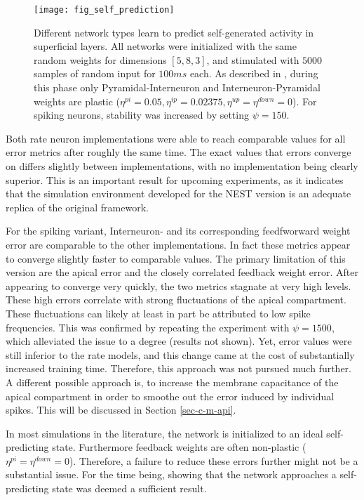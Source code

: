 \begin{figure}[t]
    \centering
    \texttt{[image: fig\_self\_prediction]}
    \caption{Different network types learn to predict self-generated activity in superficial layers. All networks were
        initialized with the same random weights for dimensions $[5, 8, 3]$, and stimulated with $5000$ samples of
        random input for $100ms$ each. As described in \cite{sacramento2018dendritic}, during this phase only
        Pyramidal-Interneuron and Interneuron-Pyramidal weights are plastic ($\eta^{pi}=0.05, \eta^{ip}=0.02375,
            \eta^{up}=\eta^{down}=0$). For spiking neurons, stability was increased by setting $\psi=150$.}
    \label{fig-self-pred}
\end{figure}

Both rate neuron implementations were able to reach comparable values for all error metrics after roughly the same time.
The exact values that errors converge on differs slightly between implementations, with no implementation being clearly
superior. This is an important result for upcoming experiments, as it indicates that the simulation environment
developed for the NEST version is an adequate replica of the original framework.

For the spiking variant, Interneuron- and its corresponding feedfworward weight error are comparable to the other
implementations. In fact these metrics appear to converge slightly faster to comparable values. The primary limitation
of this version are the apical error and the closely correlated feedback weight error. After appearing to converge very
quickly, the two metrics stagnate at very high levels. These high errors correlate with strong fluctuations of the
apical compartment. These fluctuations can likely at least in part be attributed to low spike frequencies. This was
confirmed by repeating the experiment with $\psi=1500$, which alleviated the issue to a degree (results not shown). Yet,
error values were still inferior to the rate models, and this change came at the cost of substantially increased
training time. Therefore, this approach was not pursued much further. A different possible approach is, to increase the
membrane capacitance of the apical compartment in order to smoothe out the error induced by individual spikes. This will
be discussed in Section \ref{sec-c-m-api}.

In most simulations in the literature, the network is initialized to an ideal self-predicting state. Furthermore
feedback weights are often non-plastic ($\eta^{pi}=\eta^{down}=0$). Therefore, a failure to reduce these errors further
might not be a substantial issue. For the time being, showing that the network approaches a self-predicting state was
deemed a sufficient result.


